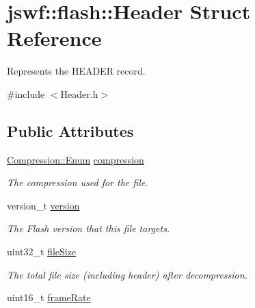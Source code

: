 \hypertarget{structjswf_1_1flash_1_1_header}{\section{jswf\+:\+:flash\+:\+:Header Struct Reference}
\label{structjswf_1_1flash_1_1_header}
}


Represents the {\ttfamily H\+E\+A\+D\+E\+R} record.  




{\ttfamily \#include $<$Header.\+h$>$}

\subsection*{Public Attributes}
\begin{DoxyCompactItemize}
\item 
\hypertarget{structjswf_1_1flash_1_1_header_aeeec53edb1da8f04f91c0dfc999ce02b}{\hyperlink{structjswf_1_1flash_1_1_compression_a393e4fe7bb01f081e0c1d1d009c22c2a}{Compression\+::\+Enum} \hyperlink{structjswf_1_1flash_1_1_header_aeeec53edb1da8f04f91c0dfc999ce02b}{compression}}\label{structjswf_1_1flash_1_1_header_aeeec53edb1da8f04f91c0dfc999ce02b}

\begin{DoxyCompactList}\small\item\em The compression used for the file. \end{DoxyCompactList}\item 
\hypertarget{structjswf_1_1flash_1_1_header_afee43d7f58d6e6f9274fd238bf33619e}{version\+\_\+t \hyperlink{structjswf_1_1flash_1_1_header_afee43d7f58d6e6f9274fd238bf33619e}{version}}\label{structjswf_1_1flash_1_1_header_afee43d7f58d6e6f9274fd238bf33619e}

\begin{DoxyCompactList}\small\item\em The Flash version that this file targets. \end{DoxyCompactList}\item 
\hypertarget{structjswf_1_1flash_1_1_header_a6886af043400e1d2a5300e7110e88de0}{uint32\+\_\+t \hyperlink{structjswf_1_1flash_1_1_header_a6886af043400e1d2a5300e7110e88de0}{file\+Size}}\label{structjswf_1_1flash_1_1_header_a6886af043400e1d2a5300e7110e88de0}

\begin{DoxyCompactList}\small\item\em The total file size (including header) after decompression. \end{DoxyCompactList}\item 
\hypertarget{structjswf_1_1flash_1_1_header_a2d609e0a85bd0eef4a2b79e7cd793789}{uint16\+\_\+t \hyperlink{structjswf_1_1flash_1_1_header_a2d609e0a85bd0eef4a2b79e7cd793789}{frame\+Rate}}\label{structjswf_1_1flash_1_1_header_a2d609e0a85bd0eef4a2b79e7cd793789}


\end{DoxyCompactItemize}
